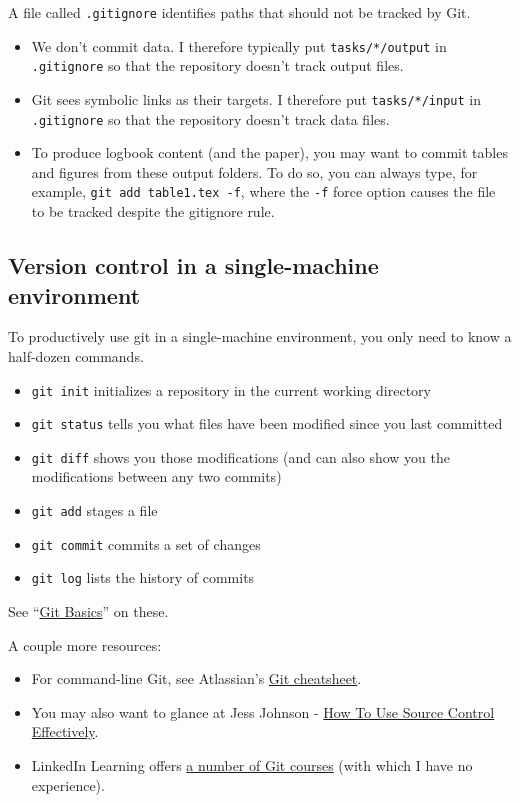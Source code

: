 A file called \texttt{.gitignore} identifies paths that should not be tracked by Git.
\begin{itemize}
\item
We don't commit data.
I therefore typically put \texttt{tasks/*/output} in \texttt{.gitignore} so that the repository doesn't track output files.
\item
Git sees symbolic links as their targets.
I therefore put \texttt{tasks/*/input} in \texttt{.gitignore} so that the repository doesn't track data files.
\item
To produce logbook content (and the paper), you may want to commit tables and figures from these output folders.
To do so, you can always type, for example, \texttt{git add table1.tex -f}, where the \texttt{-f} force option causes the file to be tracked despite the gitignore rule.
\end{itemize}

\subsection{Version control in a single-machine environment}

To productively use git in a single-machine environment, you only need to know a half-dozen commands.
\begin{itemize}
\item \texttt{git init} initializes a repository in the current working directory
\item \texttt{git status} tells you what files have been modified since you last committed
\item \texttt{git diff} shows you those modifications (and can also show you the modifications between any two commits)
\item \texttt{git add} stages a file
\item \texttt{git commit} commits a set of changes
\item \texttt{git log} lists the history of commits
\end{itemize}
See ``\href{https://git-scm.com/book/en/v2/Git-Basics-Getting-a-Git-Repository}{Git Basics}'' on these.

A couple more resources:
\begin{itemize}
\item For command-line Git, see Atlassian's \href{https://www.atlassian.com/git/tutorials/atlassian-git-cheatsheet}{Git cheatsheet}.
\item You may also want to glance at Jess Johnson - \href{http://www.grokcode.com/717/how-to-use-source-control-effectively/}{How To Use Source Control Effectively}.
\item LinkedIn Learning offers \href{https://www.linkedin.com/learning/search?keywords=git}{a number of Git courses} (with which I have no experience).
\end{itemize}




